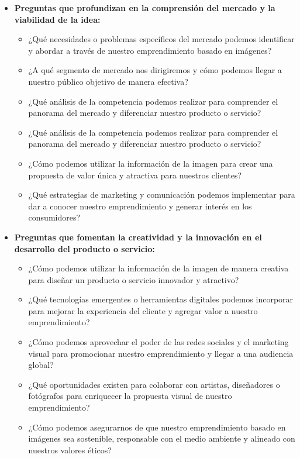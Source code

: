 \begin{itemize}
    \item \textbf{Preguntas que profundizan en la comprensión del mercado y la viabilidad de la idea:}
    \begin{itemize}
        \item ¿Qué necesidades o problemas específicos del mercado podemos identificar y abordar a través de nuestro emprendimiento basado en imágenes?
        \item ¿A qué segmento de mercado nos dirigiremos y cómo podemos llegar a nuestro público objetivo de manera efectiva?
        \item ¿Qué análisis de la competencia podemos realizar para comprender el panorama del mercado y diferenciar nuestro producto o servicio?
        \item ¿Qué análisis de la competencia podemos realizar para comprender el panorama del mercado y diferenciar nuestro producto o servicio?
        \item ¿Cómo podemos utilizar la información de la imagen para crear una propuesta de valor única y atractiva para nuestros clientes?
        \item ¿Qué estrategias de marketing y comunicación podemos implementar para dar a conocer nuestro emprendimiento y generar interés en los consumidores?
    \end{itemize}
    \item \textbf{Preguntas que fomentan la creatividad y la innovación en el desarrollo del producto o servicio:}
    \begin{itemize}
        \item ¿Cómo podemos utilizar la información de la imagen de manera creativa para diseñar un producto o servicio innovador y atractivo?
       \item ¿Qué tecnologías emergentes o herramientas digitales podemos incorporar para mejorar la experiencia del cliente y agregar valor a nuestro emprendimiento?
       \item ¿Cómo podemos aprovechar el poder de las redes sociales y el marketing visual para promocionar nuestro emprendimiento y llegar a una audiencia global?
       \item ¿Qué oportunidades existen para colaborar con artistas, diseñadores o fotógrafos para enriquecer la propuesta visual de nuestro emprendimiento?
       \item ¿Cómo podemos asegurarnos de que nuestro emprendimiento basado en imágenes sea sostenible, responsable con el medio ambiente y alineado con nuestros valores éticos?

\end{itemize}
\end{itemize}
